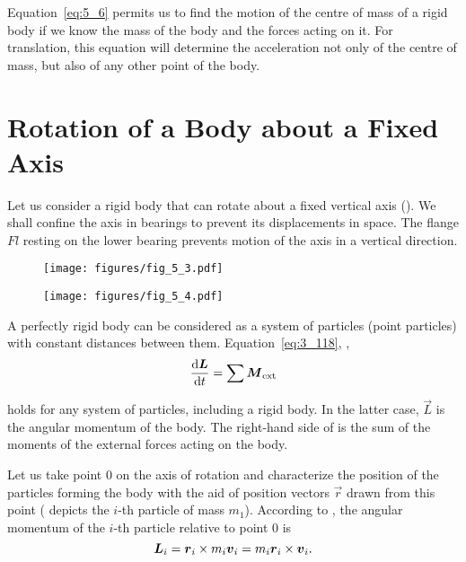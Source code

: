 Equation~\eqref{eq:5_6} permits us to find the motion of the centre of mass of a rigid body if we know the mass of the body and the forces acting on it. For translation, this equation will determine the acceleration not only of the centre of mass, but also of any other point of the body.

\section{Rotation of a Body about a Fixed Axis}\label{sec:5_3}

Let us consider a rigid body that can rotate about a fixed vertical axis (). We shall confine the axis in bearings to prevent its displacements in space. The flange $Fl$ resting on the lower bearing prevents motion of the axis in a vertical direction.

\begin{figure}[t]
	\begin{minipage}[t]{0.5\linewidth}
		\begin{center}
			\texttt{[image: figures/fig\_5\_3.pdf]}
			\caption[]{}
			\label{fig:5_3}
		\end{center}
	\end{minipage}
	\hspace{-0.05cm}
	\begin{minipage}[t]{0.5\linewidth}
		\begin{center}
			\texttt{[image: figures/fig\_5\_4.pdf]}
			\caption[]{}
			\label{fig:5_4}
		\end{center}
	\end{minipage}
\vspace{-0.5cm}
\end{figure}

A perfectly rigid body can be considered as a system of particles (point particles) with constant distances between them. Equation~\eqref{eq:3_118}, \ie,
\begin{equation*}
\frac{\mathrm{d}\boldsymbol{L}}{\mathrm{d} t} = \sum \boldsymbol{M}_{\text{ext}}
\end{equation*}

\noindent
holds for any system of particles, including a rigid body. In the latter case, $\vec{L}$ is the angular momentum of the body. The right-hand side of  is the sum of the moments of the external forces acting on the body.

Let us take point $0$ on the axis of rotation and characterize the position of the particles forming the body with the aid of position vectors $\vec{r}$ drawn from this point ( depicts the $i$-th particle of mass $m_1$). According to , the angular momentum of the $i$-th particle relative to point $0$ is
\begin{equation}\label{eq:5_7}
\boldsymbol{L}_i = \boldsymbol{r}_i \times m_i\boldsymbol{v}_i = m_i\boldsymbol{r}_{i}\times\boldsymbol{v}_{i}.
\end{equation}

